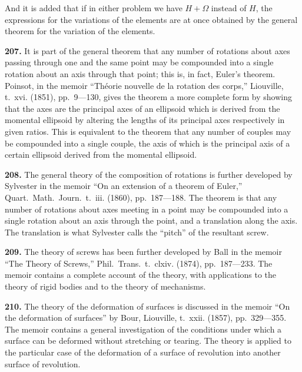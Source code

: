 \documentclass[12pt,a4paper]{article}
\theoremstyle{definition}
\begin{document}
And it is added that if in either problem we have $H + \Omega$ instead of $H$, the expressions for the variations of the elements are at once obtained by the general theorem for the variation of the elements.

\vspace{1em}

\noindent\textbf{207.} It is part of the general theorem that any number of rotations about axes passing through one and the same point may be compounded into a single rotation about an axis through that point; this is, in fact, Euler's theorem. Poinsot, in the memoir ``Th\'{e}orie nouvelle de la rotation des corps,'' Liouville, t.~xvi. (1851), pp.~9---130, gives the theorem a more complete form by showing that the axes are the principal axes of an ellipsoid which is derived from the momental ellipsoid by altering the lengths of its principal axes respectively in given ratios. This is equivalent to the theorem that any number of couples may be compounded into a single couple, the axis of which is the principal axis of a certain ellipsoid derived from the momental ellipsoid.

\vspace{1em}

\noindent\textbf{208.} The general theory of the composition of rotations is further developed by Sylvester in the memoir ``On an extension of a theorem of Euler,'' Quart.~Math.~Journ.~t.~iii. (1860), pp.~187---188. The theorem is that any number of rotations about axes meeting in a point may be compounded into a single rotation about an axis through the point, and a translation along the axis. The translation is what Sylvester calls the ``pitch'' of the resultant screw.

\vspace{1em}

\noindent\textbf{209.} The theory of screws has been further developed by Ball in the memoir ``The Theory of Screws,'' Phil.~Trans.~t.~clxiv. (1874), pp.~187---233. The memoir contains a complete account of the theory, with applications to the theory of rigid bodies and to the theory of mechanisms.

\vspace{1em}

\noindent\textbf{210.} The theory of the deformation of surfaces is discussed in the memoir ``On the deformation of surfaces'' by Bour, Liouville, t.~xxii. (1857), pp.~329---355. The memoir contains a general investigation of the conditions under which a surface can be deformed without stretching or tearing. The theory is applied to the particular case of the deformation of a surface of revolution into another surface of revolution.
\end{document}
